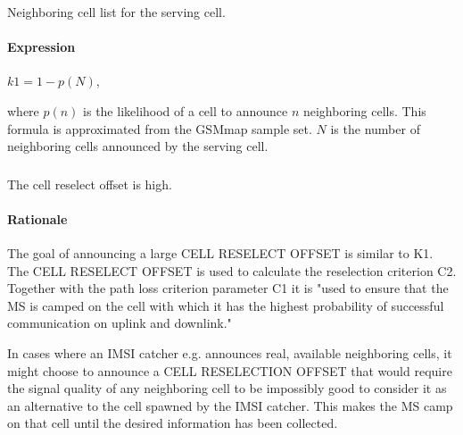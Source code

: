 \documentclass[a4paper,11pt,notitlepage,bigheadings,oneside]{scrartcl}
\begin{document}
Neighboring cell list for the serving cell.

\paragraph{Expression}

$k1 = 1 - p(N)$,

where $p(n)$ is the likelihood of a cell to announce $n$ neighboring cells.
This formula is approximated from the GSMmap sample set. $N$ is the number of
neighboring cells announced by the serving cell.


\subsubsection{}

The cell reselect offset is high.

\paragraph{Rationale}

The goal of announcing a large CELL RESELECT OFFSET is similar to K1. The CELL
RESELECT OFFSET is used to calculate the reselection criterion C2. Together
with the path loss criterion parameter C1 it is "used to ensure that the MS is
camped on the cell with which it has the highest probability of successful
communication on uplink and downlink." \cite[6.4]{gsm0508}

In cases where an IMSI catcher e.g. announces real, available neighboring
cells, it might choose to announce a CELL RESELECTION OFFSET that would require
the signal quality of any neighboring cell to be impossibly good to consider it
as an alternative to the cell spawned by the IMSI catcher. This makes the MS
camp on that cell until the desired information has been collected.


%
\end{document}
